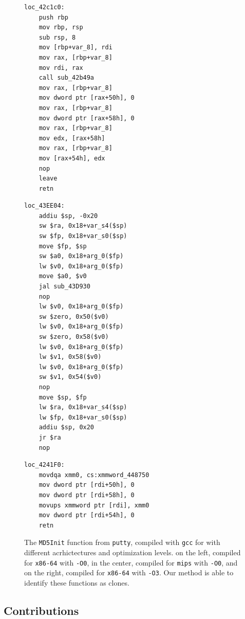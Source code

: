 \begin{figure}
\centering
\begin{minipage}[t]{0.32\linewidth}
\centering
\begin{verbatim}
loc_42c1c0:
    push rbp
    mov rbp, rsp
    sub rsp, 8
    mov [rbp+var_8], rdi
    mov rax, [rbp+var_8]
    mov rdi, rax
    call sub_42b49a
    mov rax, [rbp+var_8]
    mov dword ptr [rax+50h], 0
    mov rax, [rbp+var_8]
    mov dword ptr [rax+58h], 0
    mov rax, [rbp+var_8]
    mov edx, [rax+58h]
    mov rax, [rbp+var_8]
    mov [rax+54h], edx
    nop 
    leave 
    retn 
\end{verbatim}
\end{minipage}
\hfill
\begin{minipage}[t]{0.32\linewidth}
\centering
\begin{verbatim}
loc_43EE04:
    addiu $sp, -0x20
    sw $ra, 0x18+var_s4($sp)
    sw $fp, 0x18+var_s0($sp)
    move $fp, $sp
    sw $a0, 0x18+arg_0($fp)
    lw $v0, 0x18+arg_0($fp)
    move $a0, $v0
    jal sub_43D930
    nop 
    lw $v0, 0x18+arg_0($fp)
    sw $zero, 0x50($v0)
    lw $v0, 0x18+arg_0($fp)
    sw $zero, 0x58($v0)
    lw $v0, 0x18+arg_0($fp)
    lw $v1, 0x58($v0)
    lw $v0, 0x18+arg_0($fp)
    sw $v1, 0x54($v0)
    nop 
    move $sp, $fp
    lw $ra, 0x18+var_s4($sp)
    lw $fp, 0x18+var_s0($sp)
    addiu $sp, 0x20
    jr $ra
    nop 
\end{verbatim}
\end{minipage}
\begin{minipage}[t]{0.32\linewidth}
\centering
\begin{verbatim}
loc_4241F0:
    movdqa xmm0, cs:xmmword_448750
    mov dword ptr [rdi+50h], 0
    mov dword ptr [rdi+58h], 0
    movups xmmword ptr [rdi], xmm0
    mov dword ptr [rdi+54h], 0
    retn
\end{verbatim}
\end{minipage}
\caption{The \texttt{MD5Init} function from \texttt{putty}, compiled with \texttt{gcc} for with different acrhictectures and optimization levels.
    on the left, compiled for \texttt{x86-64} with \texttt{-O0}, in the center, compiled for \texttt{mips} with \texttt{-O0}, and on the right,
    compiled for \texttt{x86-64} with \texttt{-O3}.  Our method is able to identify these functions as clones.}
\label{asm-diff}
\end{figure}

\subsection{Contributions}

